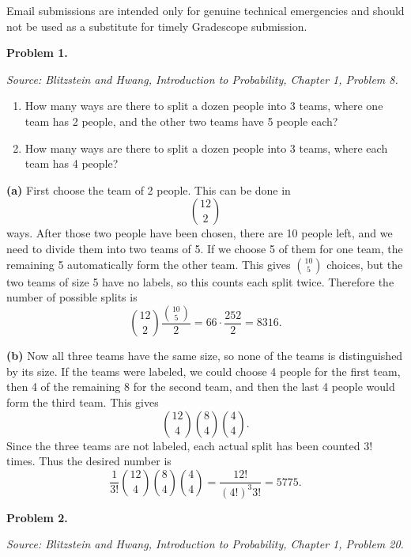 \documentclass[11pt]{article}
\newcommand{\source}[1]{%
    \vspace{0.15cm}
    {\small\textit{Source: Blitzstein and Hwang, \textit{Introduction to Probability}, Chapter 1, Problem #1.}}
}
\begin{document}
Email submissions are intended only for genuine technical emergencies and should not be used as a substitute for timely Gradescope submission.

\newpage


\begin{problemheader}
\textbf{Problem 1. }
\end{problemheader}
\source{8}

\begin{enumerate}[label=(\alph*), leftmargin=*]
    \item How many ways are there to split a dozen people into 3 teams, where one team has 2 people, and the other two teams have 5 people each?

    \item How many ways are there to split a dozen people into 3 teams, where each team has 4 people?
\end{enumerate}

\begin{solutionbox}
\textbf{(a)} First choose the team of 2 people. This can be done in
\[
\binom{12}{2}
\]
ways. After those two people have been chosen, there are 10 people left, and we need to divide them into two teams of 5. If we choose 5 of them for one team, the remaining 5 automatically form the other team. This gives \(\binom{10}{5}\) choices, but the two teams of size 5 have no labels, so this counts each split twice. Therefore the number of possible splits is
\[
\binom{12}{2}\frac{\binom{10}{5}}{2}
=
66\cdot \frac{252}{2}
=
8316.
\]



\textbf{(b)} Now all three teams have the same size, so none of the teams is distinguished by its size. If the teams were labeled, we could choose 4 people for the first team, then 4 of the remaining 8 for the second team, and then the last 4 people would form the third team. This gives
\[
\binom{12}{4}\binom{8}{4}\binom{4}{4}.
\]
Since the three teams are not labeled, each actual split has been counted \(3!\) times. Thus the desired number is
\[
\frac{1}{3!}\binom{12}{4}\binom{8}{4}\binom{4}{4}
=
\frac{12!}{(4!)^3 3!}
=
5775.
\]


\end{solutionbox}
\newpage


\begin{problemheader}
\textbf{Problem 2. }
\end{problemheader}
\source{20}
\end{document}
